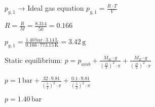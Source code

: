 \( p_{g,1} \) → Ideal gas equation  
\( p_{g,1} = \frac{R \cdot T}{V} \)  

\( R = \frac{R}{M} = \frac{8.314}{50} = 0.166 \)  

\( p_{g,1} = \frac{1.40 \, \text{bar} \cdot 3.14 \, \text{L}}{0.166 \cdot 773.15 \, \text{K}} = 3.42 \, \text{g} \)  

Static equilibrium:  
\( p = p_{amb} + \frac{M_K \cdot g}{\left(\frac{D}{2}\right)^2 \cdot \pi} + \frac{M_E \cdot g}{\left(\frac{D}{2}\right)^2 \cdot \pi} \)  

\( p = 1 \, \text{bar} + \frac{32 \cdot 9.81}{\left(\frac{5}{2}\right)^2 \cdot \pi} + \frac{0.1 \cdot 9.81}{\left(\frac{5}{2}\right)^2 \cdot \pi} \)  

\( p = 1.40 \, \text{bar} \)
